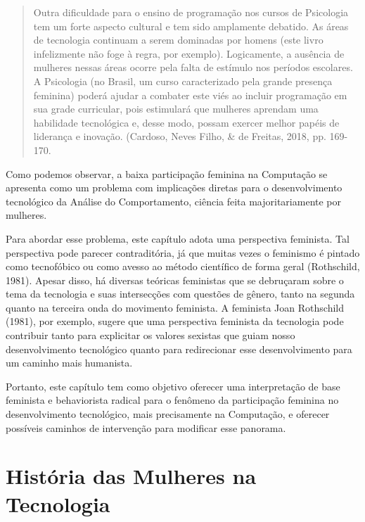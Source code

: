 \begin{quote}
    Outra dificuldade para o ensino de programação nos cursos de Psicologia tem um forte aspecto cultural e tem sido amplamente debatido. As áreas de tecnologia continuam a serem dominadas por homens (este livro infelizmente não foge à regra, por exemplo). Logicamente, a ausência de mulheres nessas áreas ocorre pela falta de estímulo nos períodos escolares. A Psicologia (no Brasil, um curso caracterizado pela grande presença feminina) poderá ajudar a combater este viés ao incluir programação em sua grade curricular, pois estimulará que mulheres aprendam uma habilidade tecnológica e, desse modo, possam exercer melhor papéis de liderança e inovação. (Cardoso, Neves Filho, \& de Freitas, 2018, pp. 169-170.
\end{quote}

Como podemos observar, a baixa participação feminina na Computação se apresenta como um problema com implicações diretas para o desenvolvimento tecnológico da Análise do Comportamento, ciência feita majoritariamente por mulheres. 

Para abordar esse problema, este capítulo adota uma perspectiva feminista. Tal perspectiva pode parecer contraditória, já que muitas vezes o feminismo é pintado como tecnofóbico ou como avesso ao método científico de forma geral (Rothschild, 1981). Apesar disso, há diversas teóricas feministas que se debruçaram sobre o tema da tecnologia e suas intersecções com questões de gênero, tanto na segunda quanto na terceira onda do movimento feminista. A feminista Joan Rothschild (1981), por exemplo, sugere que uma perspectiva feminista da tecnologia pode contribuir tanto para explicitar os valores sexistas que guiam nosso desenvolvimento tecnológico quanto para redirecionar esse desenvolvimento para um caminho mais humanista. 

Portanto, este capítulo tem como objetivo oferecer uma interpretação de base feminista e behaviorista radical para o fenômeno da participação feminina no desenvolvimento tecnológico, mais precisamente na Computação, e oferecer possíveis caminhos de intervenção para modificar esse panorama. 

\section{História das Mulheres na Tecnologia}

